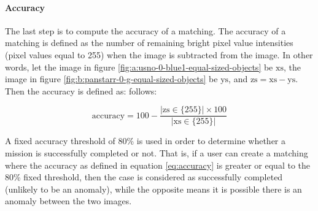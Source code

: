 \paragraph{Accuracy} \label{paragraph:case-study:impl:accuracy}
The last step is to compute the accuracy of a matching. The accuracy of a matching is defined as the number of remaining bright pixel value intensities (pixel values equal to 255) when the \usno image is subtracted from the \panstarrs image. In other words, let the \usno image in figure \ref{fig:a:usno-0-blue1-equal-sized-objects} be $\text{xs}$, the \panstarrs image in figure \ref{fig:b:panstarr-0-g-equal-sized-objects} be $\text{ys}$, and $\text{zs}=\text{xs} - \text{ys}$. Then the accuracy is defined as: follows:

\begin{equation} \label{eq:accuracy}
    \text{accuracy} = 100 - \frac{|\text{zs} \in \{255\} | \times 100}{|\text{xs} \in \{255\} |}
\end{equation}

A fixed accuracy threshold of $80$\% is used in order to determine whether a mission is successfully completed or not. That is, if a user can create a matching where the accuracy as defined in equation \ref{eq:accuracy} is greater or equal to the $80$\% fixed threshold, then the case is considered as successfully completed (unlikely to be an anomaly), while the opposite means it is possible there is an anomaly between the two images.
